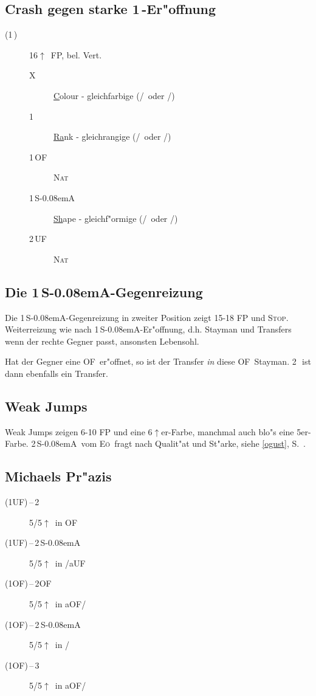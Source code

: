 \documentclass[11pt,german,twocolumn]{scrartcl}
\renewcommand{\Cl}{{\color{ClColor}{$\clubsuit$}}}
\renewcommand{\Di}{{\color{DiColor}{$\vardiamondsuit$}}}
\renewcommand{\He}{{\color{HeColor}{$\varheartsuit$}}}
\renewcommand{\Sp}{{\color{SpColor}{$\spadesuit$}}}
\def\kar{\,\Di}
\def\tre{\,\Cl}
\def\pi{\Sp}
\def\co{\He}
\def\ka{\Di}
\def\tr{\Cl}
\def\pl{$\uparrow$}
\def\uf{\textsf{\,UF}}
\def\of{\textsf{\,OF}}
\def\ufa{\textsf{UF}}
\def\aufa{\textsf{aUF}}
\def\ofa{\textsf{OF}}
\def\aofa{\textsf{aOF}}
\def\SA{\textsf{\,S\kern-0.08emA}}
\def\kontra{\textsf{X}}
\def\sep{\,--\,}
\def\nat{\textsc{Nat}}
\def\stp{\textsc{Stop}}
\def\eo{\textsc{E\"o}}
\def\bdsc{\begin{description}}
\def\edsc{\end{description}}
\begin{document}
\subsection{Crash gegen starke 1\tre-Er"offnung}

\bdsc
\item[(1\tre)] 16\pl\ FP, bel. Vert.
\bdsc
\item[\kontra] \underline{C}olour - gleichfarbige (\tr/\pi\ oder \ka/\co)
\item[1\kar] \underline{Ra}nk - gleichrangige (\tr/\ka\ oder \co/\pi)
\item[1\of] \nat
\item[1\SA] \underline{Sh}ape - gleichf"ormige (\tr/\co\ oder \ka/\pi)
\item[2\uf] \nat
\edsc
\edsc

\subsection{Die 1\SA-Gegenreizung}

Die 1\SA-Gegenreizung in zweiter Position zeigt 15-18 FP und \stp. Weiterreizung wie nach
1\SA-Er"offnung, d.h. Stayman und Transfers wenn der rechte Gegner passt,
ansonsten Lebensohl.

Hat der Gegner eine \ofa\ er"offnet, so ist der Transfer \emph{in} diese \ofa\
Stayman. 2\tre\ ist dann ebenfalls ein Transfer.

\subsection{Weak Jumps}

Weak Jumps zeigen 6-10 FP und eine 6\pl{}er-Farbe, manchmal auch blo"s eine
5er-Farbe. 2\SA\ vom \eo\ fragt nach Qualit"at und St"arke, siehe \ref{ogust},
S.~\pageref{ogust}.

\subsection{Michaels Pr"azis}

\bdsc
\item[(1\ufa)\sep2\ka] 5/5\pl\ in \ofa
\item[(1\ufa)\sep2\SA] 5/5\pl\ in \co/\aufa
\item[(1\ofa)\sep2\ofa] 5/5\pl\ in \aofa/\tr
\item[(1\ofa)\sep2\SA] 5/5\pl\ in \tr/\ka
\item[(1\ofa)\sep3\tre] 5/5\pl\ in \aofa/\ka
\edsc
\end{document}
